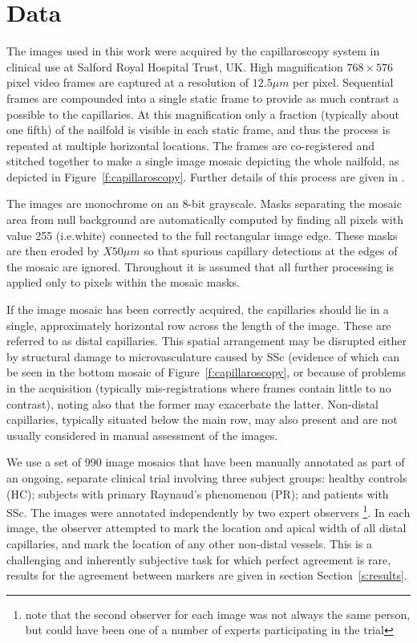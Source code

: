 \documentclass[runningheads,a4paper]{llncs}
\newcommand{\fref}[1]{Figure~\ref{#1}}
\newcommand{\sref}[1]{Section~\ref{#1}}
\def\ie{i.e.}
\begin{document}
\section{Data}
The images used in this work were acquired by the capillaroscopy system in clinical use at Salford Royal Hospital Trust, UK. High magnification $768 \times 576$ pixel video frames are captured at a resolution of $12.5 \mu m$ per pixel. Sequential frames are compounded into a single static frame to provide as much contrast a possible to the capillaries. At this magnification only a fraction (typically about one fifth) of the nailfold is visible in each static frame, and thus the process is repeated at multiple horizontal locations. The frames are co-registered and stitched together to make a single image mosaic depicting the whole nailfold, as depicted in \fref{f:capillaroscopy}. Further details of this process are given in \cite{}.

The images are monochrome on an 8-bit grayscale. Masks separating the mosaic area from null background are automatically computed by finding all pixels with value 255 (\ie white) connected to the full rectangular image edge. These masks are then eroded by $X 50 \mu m$ so that spurious capillary detections at the edges of the mosaic are ignored. Throughout it is assumed that all further processing is applied only to pixels within the mosaic masks.

If the image mosaic has been correctly acquired, the capillaries should lie in a single, approximately horizontal row across the length of the image. These are referred to as distal capillaries. This spatial arrangement may be disrupted either by structural damage to microvasculature caused by SSc (evidence of which can be seen in the bottom mosaic of \fref{f:capillaroscopy}, or because of problems in the acquisition (typically mis-registrations where frames contain little to no contrast), noting also that the former may exacerbate the latter. Non-distal capillaries, typically situated below the main row, may also present and are not usually considered in manual assessment of the images.

We use a set of 990 image mosaics that have been manually annotated as part of an ongoing, separate clinical trial involving three subject groups: healthy controls (HC); subjects with primary Raynaud's phenomenon (PR); and patients with SSc. The images were annotated independently by two expert observers \footnote{note that the second observer for each image was not always the same person, but could have been one of a number of experts participating in the trial}. In each image, the observer attempted to mark the location and apical width of all distal capillaries, and mark the location of any other non-distal vessels. This is a challenging and inherently subjective task for which perfect agreement is rare, results for the agreement between markers are given in section \sref{s:results}.
\end{document}
